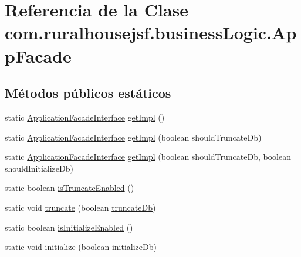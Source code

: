 \hypertarget{classcom_1_1ruralhousejsf_1_1business_logic_1_1_app_facade}{}\section{Referencia de la Clase com.\+ruralhousejsf.\+business\+Logic.\+App\+Facade}
\label{classcom_1_1ruralhousejsf_1_1business_logic_1_1_app_facade}
\subsection*{Métodos públicos estáticos}
\begin{DoxyCompactItemize}
\item 
static \mbox{\hyperlink{interfacecom_1_1ruralhousejsf_1_1business_logic_1_1_application_facade_interface}{Application\+Facade\+Interface}} \mbox{\hyperlink{classcom_1_1ruralhousejsf_1_1business_logic_1_1_app_facade_a029bcceee98b9070b9f80abc54db45d6}{get\+Impl}} ()
\item 
static \mbox{\hyperlink{interfacecom_1_1ruralhousejsf_1_1business_logic_1_1_application_facade_interface}{Application\+Facade\+Interface}} \mbox{\hyperlink{classcom_1_1ruralhousejsf_1_1business_logic_1_1_app_facade_aa4bf7166aae19a2d640fd6ab8a0fff96}{get\+Impl}} (boolean should\+Truncate\+Db)
\item 
static \mbox{\hyperlink{interfacecom_1_1ruralhousejsf_1_1business_logic_1_1_application_facade_interface}{Application\+Facade\+Interface}} \mbox{\hyperlink{classcom_1_1ruralhousejsf_1_1business_logic_1_1_app_facade_aab339d9b44293704c9214aef70c7c704}{get\+Impl}} (boolean should\+Truncate\+Db, boolean should\+Initialize\+Db)
\item 
static boolean \mbox{\hyperlink{classcom_1_1ruralhousejsf_1_1business_logic_1_1_app_facade_a3638d881ea2d917df632a313d9ed9b20}{is\+Truncate\+Enabled}} ()
\item 
static void \mbox{\hyperlink{classcom_1_1ruralhousejsf_1_1business_logic_1_1_app_facade_a98aed1ed8a03c6a92e15121fed4eb452}{truncate}} (boolean \mbox{\hyperlink{classcom_1_1ruralhousejsf_1_1business_logic_1_1_app_facade_ac9cbe77035be5cc1f9bf258c57ca6564}{truncate\+Db}})
\item 
static boolean \mbox{\hyperlink{classcom_1_1ruralhousejsf_1_1business_logic_1_1_app_facade_a0486115e3ba238d025e23ec62548b3bc}{is\+Initialize\+Enabled}} ()
\item 
static void \mbox{\hyperlink{classcom_1_1ruralhousejsf_1_1business_logic_1_1_app_facade_a48252ec119a6bb16f5353df6ec6eff54}{initialize}} (boolean \mbox{\hyperlink{classcom_1_1ruralhousejsf_1_1business_logic_1_1_app_facade_a08e1f188faabf8bef71610c49bdd5d84}{initialize\+Db}})
\end{DoxyCompactItemize}
